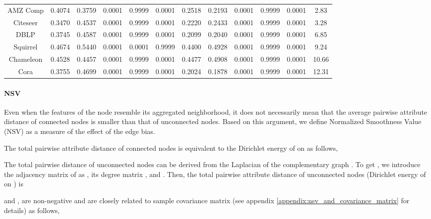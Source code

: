 \documentclass{article}
\newcommand{\0}{{\boldsymbol{0}}}
\newcommand{\6}{{\partial}}
\newcommand{\8}{{\infty}}
\newcommand{\4}{{\nabla}}
\begin{document}
\begin{table*}[htbp]
{\begin{tabular}{c|cc|ccc|cc|ccc|c}
    AMZ Comp & 0.4074 & 0.3759 & 0.0001     & 0.9999     & 0.0001     & 0.2518 & 0.2193 & 0.0001     & 0.9999     & 0.0001    & \textcolor[rgb]{ 0,  .69,  .314}{2.83} \\
    Citeseer & 0.3470 & 0.4537 & 0.0001     & 0.9999     & 0.0001     & 0.2220 & 0.2433 & 0.0001     & 0.9999     & 0.0001     & \textcolor[rgb]{ 0,  .69,  .314}{3.28} \\
    DBLP  & 0.3745 & 0.4587 & 0.0001     & 0.9999    & 0.0001     & 0.2099 & 0.2040 & 0.0001     & 0.9999    & 0.0001     & \textcolor[rgb]{ 0,  .69,  .314}{6.85} \\
    Squirrel & 0.4674 & 0.5440 & 0.0001     & 0.0001     & 0.9999     & 0.4400 & 0.4928 & 0.0001    & 0.9999     & 0.0001     & \textcolor[rgb]{ 0,  .69,  .314}{9.24} \\
    Chameleon & 0.4528 & 0.4457 & 0.0001     & 0.9999    & 0.0001     & 0.4477 & 0.4908 & 0.0001     & 0.9999    & 0.0001     & \textcolor[rgb]{ 0,  .69,  .314}{10.66} \\
    Cora  & 0.3755 & 0.4699 & 0.0001     & 0.9999    & 0.0001     & 0.2024 & 0.1878 & 0.0001     & 0.9999    & 0.0001    & \textcolor[rgb]{ 0,  .69,  .314}{12.31} \\
    \bottomrule
    \bottomrule
    \end{tabular}}
  \label{tab:stats}\end{table*}%
\paragraph{NSV} 
Even when the features of the node resemble its aggregated neighborhood, it does not necessarily mean that the average pairwise attribute distance of connected nodes is smaller than that of unconnected nodes. Based on this argument, we define Normalized Smoothness Value (NSV) as a measure of the effect of the edge bias.

The total pairwise attribute distance of connected nodes is equivalent to the Dirichlet energy of  on  as follows,

The total pairwise distance of unconnected nodes can be derived from the Laplacian  of the complementary graph . To get , we introduce the adjacency matrix of   as , its degree matrix , and . Then, the total pairwise attribute distance of unconnected nodes (Dirichlet energy of  on ) is 

 and , are non-negative and are closely related to sample covariance matrix (see appendix \ref{appendix:nsv_and_covariance_matrix} for details) as follows,
\end{document}
